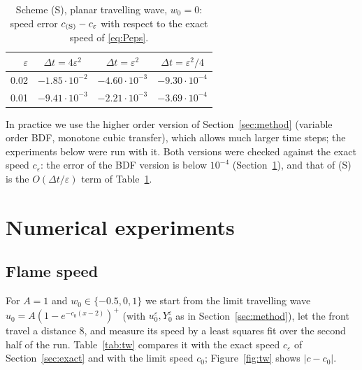 \documentclass[11pt]{amsart}
\theoremstyle{remark}
\newcommand{\ve}{\varepsilon}
\begin{document}
\begin{table}[h]
\centering
\begin{tabular}{rccc}
\toprule
$\ve$ & $\Delta t=4\ve^2$ & $\Delta t=\ve^2$ & $\Delta t=\ve^2/4$\\
\midrule
0.02 & $-1.85\cdot10^{-2}$ & $-4.60\cdot10^{-3}$ & $-9.30\cdot10^{-4}$\\
0.01 & $-9.41\cdot10^{-3}$ & $-2.21\cdot10^{-3}$ & $-3.69\cdot10^{-4}$\\
\bottomrule
\end{tabular}
\caption{Scheme (S), planar travelling wave, $w_0=0$: speed error
$c_{\rm(S)}-c_\ve$ with respect to the exact speed of \eqref{eq:Peps}.}\label{tab:simple}
\end{table}

In practice we use the higher order version of Section~\ref{sec:method}
(variable order BDF, monotone cubic transfer), which allows much larger time
steps; the experiments below were run with it. Both versions were checked
against the exact speed $c_\ve$: the error of the BDF version is below
$10^{-4}$ (Section~\ref{sec:experiments}), and that of (S) is the
$O(\Delta t/\ve)$ term of Table~\ref{tab:simple}.

\section{Numerical experiments}\label{sec:experiments}

\subsection{Flame speed}
For $A=1$ and $w_0\in\{-0.5,0,1\}$ we start from the limit travelling wave
$u_0=A(1-e^{-c_0(x-2)})^+$ (with $u_0^\ve,Y_0^\ve$ as in Section~\ref{sec:method}),
let the front travel a distance $8$, and measure its speed by a least squares
fit over the second half of the run. Table~\ref{tab:tw} compares it with the
exact speed $c_\ve$ of Section~\ref{sec:exact} and with the limit speed
$c_0$; Figure~\ref{fig:tw} shows $|c-c_0|$.
\end{document}
